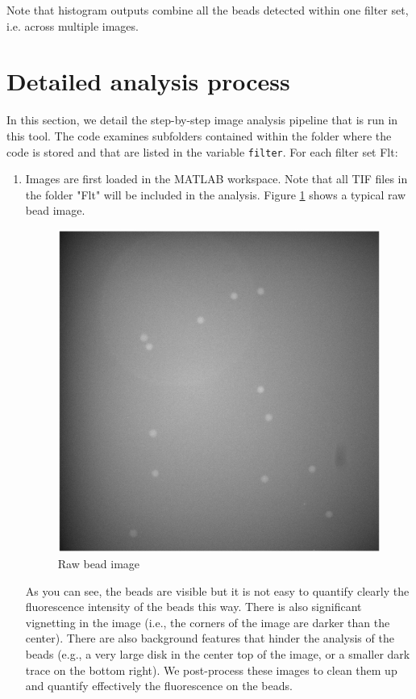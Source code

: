 \documentclass[a4paper]{article}
\begin{document}
Note that histogram outputs combine all the beads detected within one filter set, i.e. across multiple images.

\section{Detailed analysis process}
\label{section-details}
In this section, we detail the step-by-step image analysis pipeline that is run in this tool. The code examines subfolders contained within the folder where the code is stored and that are listed in the variable \verb|filter|. For each filter set Flt:

\begin{enumerate}
    \item Images are first loaded in the MATLAB workspace. Note that all TIF files in the folder "Flt" will be included in the analysis. Figure \ref{fig1} shows a typical raw bead image.
    \begin{figure}[H]
        \center
        \label{fig1}
        \includegraphics[scale=0.75]{im.png}
        \caption{Raw bead image}
    \end{figure}

    As you can see, the beads are visible but it is not easy to quantify clearly the fluorescence intensity of the beads this way. There is also significant vignetting in the image (i.e., the corners of the image are darker than the center). There are also background features that hinder the analysis of the beads (e.g., a very large disk in the center top of the image, or a smaller dark trace on the bottom right). We post-process these images to clean them up and quantify effectively the fluorescence on the beads.


\end{enumerate}
\end{document}
